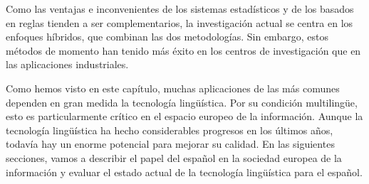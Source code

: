 \begin{multicols}{2}
Como las ventajas e inconvenientes de los sistemas estadísticos y de los basados en reglas tienden a ser complementarios, la investigación actual se centra en los enfoques híbridos, que combinan las dos metodologías. Sin embargo, estos métodos de momento han tenido más éxito en los centros de investigación que en las aplicaciones industriales.

Como hemos visto en este capítulo, muchas aplicaciones de las más comunes dependen en gran medida la tecnología lingüística. Por su condición multilingüe, esto es particularmente crítico en el espacio europeo de la información. Aunque la tecnología lingüística ha hecho considerables progresos en los últimos años, todavía hay un enorme potencial para mejorar su calidad. En las siguientes secciones, vamos a describir el papel del español en la sociedad europea de la información y evaluar el estado actual de la tecnología lingüística para el español.

\end{multicols}

\clearpage


